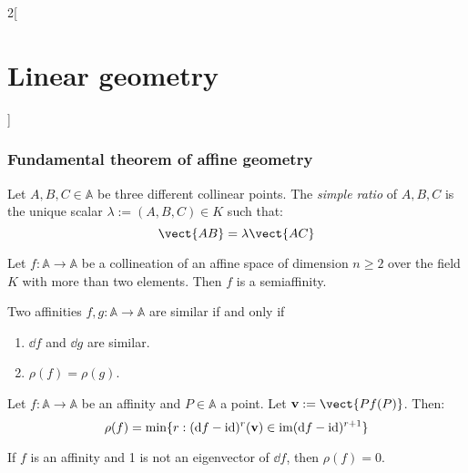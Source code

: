\documentclass[../../../main.tex]{subfiles}
\begin{document}
\begin{multicols}{2}[\section{Linear geometry}]
  \subsubsection{Fundamental theorem of affine geometry}
  \begin{definition}
    Let $A,B,C\in\mathbb{A}$ be three different collinear points. The \emph{simple ratio} of $A,B,C$ is the unique scalar $\lambda:=(A,B,C)\in K$ such that: $$\vect{AB}=\lambda\vect{AC}$$
    \begin{theorem}
      Let $f:\mathbb{A}\rightarrow\mathbb{A}$ be a collineation of an affine space of dimension $n\geq 2$ over the field $K$ with more than two elements. Then $f$ is a semiaffinity.
    \end{theorem}
    \begin{proposition}
      Two affinities $f,g:\mathbb{A}\rightarrow\mathbb{A}$ are similar if and only if
      \begin{enumerate}
        \item $\dd{f}$ and $\dd{g}$ are similar.
        \item $\rho(f)=\rho(g)$.
      \end{enumerate}
    \end{proposition}
    \begin{theorem}
      Let $f:\mathbb{A}\rightarrow\mathbb{A}$ be an affinity and $P\in\mathbb{A}$ a point. Let $\vf{v}:=\vect{Pf(P)}$. Then: $$\rho(f)=\min\{r:(\dd{f}-\mathrm{id})^r(\boldsymbol{\mathrm{v}})\in\operatorname{im}(\dd{f}-\mathrm{id})^{r+1}\}$$
    \end{theorem}
    \begin{corollary}
      If $f$ is an affinity and 1 is not an eigenvector of $\dd{f}$, then $\rho(f)=0$.
    \end{corollary}
  \end{definition}

\end{multicols}
\end{document}
